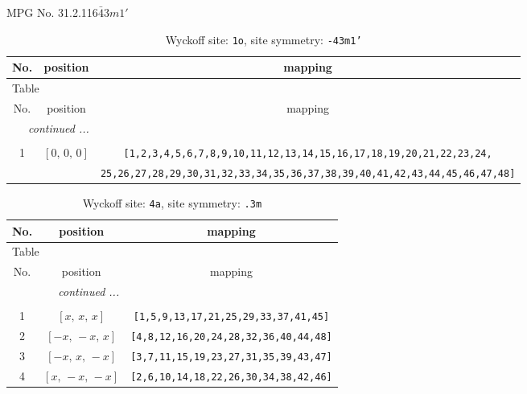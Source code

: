 \documentclass[fleqn,8pt]{jsarticle}
\begin{document}
\setcounter{MaxMatrixCols}{32}

\renewcommand{\tablename}{Table~}
\renewcommand{\figurename}{Figure~}
\begin{center}
\LARGE
MPG No. 31.2.116\quad$\bar{4}3m1'$
\end{center}
\renewcommand{\arraystretch}{1.2}
\begin{longtable}{ccc}
\caption{Wyckoff site: {\tt 1o}, site symmetry: {\tt -43m1'}}
 \\
 \hline \hline
No. & position & mapping \\ \hline \endfirsthead

\multicolumn{2}{l}{\tablename\ \thetable{}} \\
 \hline \hline
No. & position & mapping \\ \hline \endhead

 \hline \hline
\multicolumn{2}{r}{\footnotesize\it continued ...} \\ \endfoot

 \hline \hline
\multicolumn{2}{r}{} \\ \endlastfoot

1 & $\left[ 0,\, 0,\, 0 \right]$ & {\tt [1,2,3,4,5,6,7,8,9,10,11,12,13,14,15,16,17,18,19,20,21,22,23,24,} \\ \hline
 &  & {\tt 25,26,27,28,29,30,31,32,33,34,35,36,37,38,39,40,41,42,43,44,45,46,47,48]} \\
\end{longtable}
\renewcommand{\arraystretch}{1.2}
\begin{longtable}{ccc}
\caption{Wyckoff site: {\tt 4a}, site symmetry: {\tt .3m}}
 \\
 \hline \hline
No. & position & mapping \\ \hline \endfirsthead

\multicolumn{2}{l}{\tablename\ \thetable{}} \\
 \hline \hline
No. & position & mapping \\ \hline \endhead

 \hline \hline
\multicolumn{2}{r}{\footnotesize\it continued ...} \\ \endfoot

 \hline \hline
\multicolumn{2}{r}{} \\ \endlastfoot

1 & $\left[ x,\, x,\, x \right]$ & {\tt [1,5,9,13,17,21,25,29,33,37,41,45]} \\ \hline
2 & $\left[ - x,\, - x,\, x \right]$ & {\tt [4,8,12,16,20,24,28,32,36,40,44,48]} \\ \hline
3 & $\left[ - x,\, x,\, - x \right]$ & {\tt [3,7,11,15,19,23,27,31,35,39,43,47]} \\ \hline
4 & $\left[ x,\, - x,\, - x \right]$ & {\tt [2,6,10,14,18,22,26,30,34,38,42,46]} \\
\end{longtable}
\end{document}
